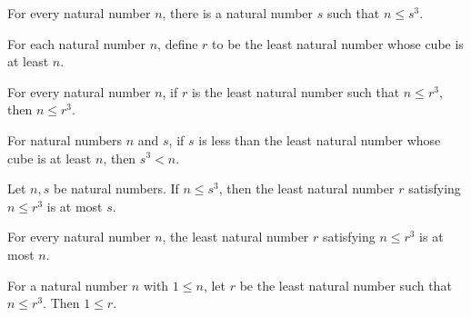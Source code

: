 \begin{theorem}
\label{Light.exists_le_cube}
\leanok
{}
For every natural number $n$, there is a natural number $s$ such that $n\le s^3$.
\end{theorem}

\begin{definition}
\label{Light.cbrtLeast}
\leanok
{}
For each natural number $n$, define $r$ to be the least natural number whose cube is at
least $n$.
\end{definition}

\begin{theorem}
\label{Light.le_cbrtLeast_pow}
\leanok
{}
For every natural number $n$, if $r$ is the least natural number such that $n\le r^3$,
then $n\le r^3$.
\end{theorem}

\begin{theorem}
\label{Light.pow_lt_of_lt_cbrtLeast}
\leanok
{}
For natural numbers $n$ and $s$, if $s$ is less than the least natural number whose cube
is at least $n$, then $s^3<n$.
\end{theorem}

\begin{theorem}
\label{Light.cbrtLeast_le}
\leanok
{}
Let $n,s$ be natural numbers. If $n\le s^3$, then the least natural number $r$
satisfying $n\le r^3$ is at most $s$.
\end{theorem}

\begin{theorem}
\label{Light.cbrtLeast_le_self}
\leanok
{}
For every natural number $n$, the least natural number $r$ satisfying $n\le r^3$ is at
most $n$.
\end{theorem}

\begin{theorem}
\label{Light.one_le_cbrtLeast}
\leanok
{}
For a natural number $n$ with $1\le n$, let $r$ be the least natural number such that
$n\le r^3$. Then $1\le r$.
\end{theorem}

